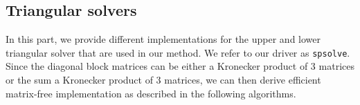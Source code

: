 \subsection{Triangular solvers}
In this part, we provide different implementations for the upper and lower triangular solver that are used in our method. We refer to our driver as \texttt{spsolve}.
Since the diagonal block matrices can be either a Kronecker product of 3 matrices or the sum a Kronecker product of 3 matrices, we can then derive efficient matrix-free implementation as described in the following algorithms.

%
%
%
%
